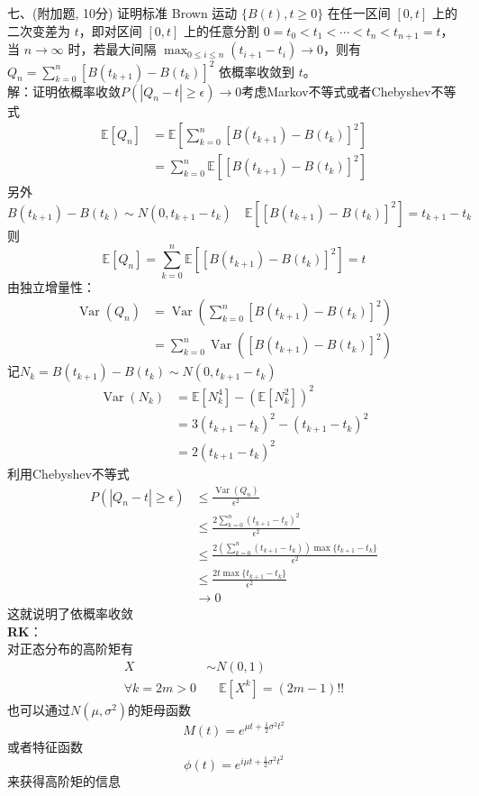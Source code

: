 \documentclass[UTF8]{ctexart}
\begin{document}
\noindent 七、(附加题, 10分) 证明标准 Brown 运动 $\{B(t), t \geq 0\}$ 在任一区间 $[0,t]$ 上的二次变差为 $t$，即对区间 $[0,t]$ 上的任意分割 $0 = t_0 < t_1 < \cdots < t_n < t_{n+1} = t$，当 $n \to \infty$ 时，若最大间隔 $\max_{0 \leq i \leq n}(t_{i+1} - t_i) \to 0$，则有 $Q_n = \sum_{k=0}^n [B(t_{k+1}) - B(t_k)]^2$ 依概率收敛到 $t$。\\
解：证明依概率收敛$P(|Q_n-t|\ge \epsilon)\rightarrow0$考虑Markov不等式或者Chebyshev不等式\\
$$
\begin{aligned}
	\mathbb{E}[Q_n] & =\mathbb{E}\left[\sum_{k=0}^n [B(t_{k+1}) - B(t_k)]^2 \right]  \\
 & =\sum_{k=0}^n \mathbb{E}\left[ [B(t_{k+1}) - B(t_k)]^2\right] 
\end{aligned}
$$
另外
\[
B(t_{k+1})-B(t_k) \sim N(0,t_{k+1}-t_k) \quad \mathbb{E}\left[ [B(t_{k+1}) - B(t_k)]^2\right] =t_{k+1}-t_k
\]
则
\[
\mathbb{E}[Q_n]=\sum_{k=0}^n \mathbb{E}\left[ [B(t_{k+1}) - B(t_k)]^2\right] =t
\]
由独立增量性：
$$
\begin{aligned}
	\operatorname{Var}(Q_n) & =\operatorname{Var}\left(\sum_{k=0}^n [B(t_{k+1}) - B(t_k)]^2 \right)  \\
	& =\sum_{k=0}^n \operatorname{Var}\left( [B(t_{k+1}) - B(t_k)]^2\right)
\end{aligned}
$$
记$N_k=B(t_{k+1})-B(t_k) \sim N(0,t_{k+1}-t_k)$\\
$$
\begin{aligned}
	\operatorname{Var}(N_k)&=\mathbb{E}[N_k^4]-\left(\mathbb{E}[N_k^2] \right)^2\\
	& =3(t_{k+1}-t_k)^2-(t_{k+1}-t_k)^2\\
	& =2(t_{k+1}-t_k)^2
\end{aligned}
$$
利用Chebyshev不等式\\
$$
\begin{aligned}
	P(|Q_n-t|\ge \epsilon)&\le \frac{\operatorname{Var}(Q_n)}{\epsilon^2}\\
	&\le \frac{2\sum_{k=0}^n(t_{k+1}-t_k)^2}{\epsilon^2}\\
	&\le \frac{2\left( \sum_{k=0}^n(t_{k+1}-t_k)\right)\max\{
		t_{k+1}-t_k\}}{\epsilon^2}\\
		&\le \frac{2t\max\{
			t_{k+1}-t_k\}}{\epsilon^2}\\
			&\rightarrow 0
\end{aligned}
$$
这就说明了依概率收敛\\
\textbf{RK}：\\
对正态分布的高阶矩有
$$
\begin{aligned}
	X &\sim N(0,1)\\
	\forall k=2m>0&\quad \mathbb{E}[X^k]=(2m-1)!!
\end{aligned}
$$
也可以通过$N(\mu,\sigma^2)$的矩母函数$$M(t)=e^{\mu t+\frac{1}{2}\sigma^2t^2}$$或者特征函数$$\phi(t)=e^{i\mu t+\frac{1}{2}\sigma^2t^2}$$来获得高阶矩的信息\\
\end{document}
